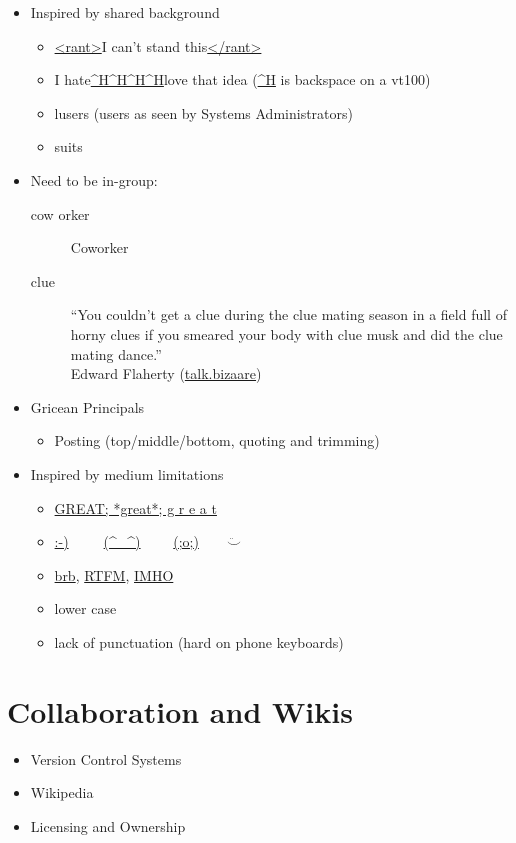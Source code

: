 \documentclass[a4paper,landscape,headrule,footrule,xetex]{foils}
\begin{document}
\begin{itemize}
\item Inspired by shared background
  \begin{itemize}
  \item \url{<rant>}I can't stand this\url{</rant>}
  \item I hate\url{^H^H^H^H}love that idea \hfill (\url{^H} is backspace on a vt100)
  \item lusers (users as seen by Systems Administrators)
  \item suits
  \end{itemize}
\item Need to be in-group: 
  \begin{description}
  \item[cow orker] Coworker
  \item[clue] ``You couldn't get a clue during the clue mating season in a field full of horny clues if you smeared your body with clue musk and did the clue mating dance.''
\\ Edward Flaherty (\url{talk.bizaare})
  \end{description}
\newpage
\item Gricean Principals
  \begin{itemize}
  \item Posting (top/middle/bottom, quoting and trimming)
  \end{itemize}

\item Inspired by medium limitations
  \begin{itemize}
  \item \url{GREAT; *great*;  g r e a t}
  \item \url{:-)}\ \ \ \ \ \url{(^_^)} \ \ \ \  \url{(;o;)}\ \ \ \ $\ddot\smile$
  \item \url{brb}, \url{RTFM}, \url{IMHO}
  \item lower case
  \item lack of punctuation (hard on phone keyboards)
  \end{itemize}

\end{itemize}

\section{Collaboration and Wikis}

\MyLogo{}
\begin{itemize}
\item Version Control Systems
\item Wikipedia
\item Licensing and Ownership 
\end{itemize}
\end{document}
